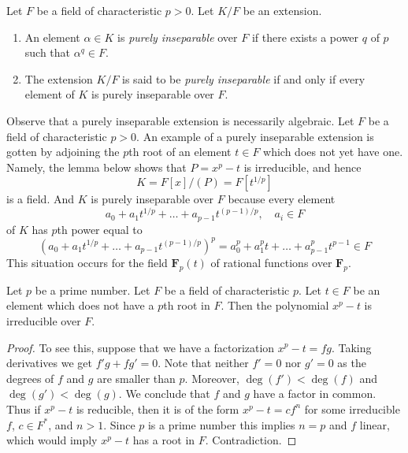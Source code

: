 \begin{definition}
\label{definition-purely-inseparable}
Let $F$ be a field of characteristic $p > 0$. Let $K/F$ be an extension.
\begin{enumerate}
\item An element $\alpha \in K$ is {\it purely inseparable} over $F$
if there exists a power $q$ of $p$ such that $\alpha^q \in F$.
\item The extension $K/F$ is said to be {\it purely inseparable}
if and only if every element of $K$ is purely inseparable over $F$.
\end{enumerate}
\end{definition}

\noindent
Observe that a purely inseparable extension is necessarily algebraic.
Let $F$ be a field of characteristic $p > 0$.
An example of a purely inseparable extension is gotten by adjoining
the $p$th root of an element $t \in F$ which does not yet have one. Namely,
the lemma below shows that $P = x^p - t$ is irreducible, and hence
$$
K = F[x]/(P) = F[t^{1/p}]
$$
is a field. And $K$ is purely inseparable over $F$ because every element
$$
a_0 + a_1t^{1/p} + \ldots + a_{p - 1}t^{(p - 1)/p},\quad a_i \in F
$$
of $K$ has $p$th power equal to
$$
(a_0 + a_1t^{1/p} + \ldots + a_{p - 1}t^{(p - 1)/p})^p =
a_0^p + a_1^p t + \ldots + a_{p - 1}^pt^{p - 1} \in F
$$
This situation occurs for the field
$\mathbf{F}_p(t)$ of rational functions over $\mathbf{F}_p$.

\begin{lemma}
\label{lemma-take-pth-root}
Let $p$ be a prime number. Let $F$ be a field of characteristic $p$.
Let $t \in F$ be an element which does not have a $p$th root in $F$.
Then the polynomial $x^p - t$ is irreducible over $F$.
\end{lemma}

\begin{proof}
To see this, suppose that we have a factorization
$x^p - t = f g$. Taking derivatives we get $f' g + f g' = 0$.
Note that neither $f' = 0$ nor $g' = 0$ as the degrees of $f$ and $g$
are smaller than $p$. Moreover, $\deg(f') < \deg(f)$ and $\deg(g') < \deg(g)$.
We conclude that $f$ and $g$ have a factor in common. Thus if $x^p - t$
is reducible, then it is of the form $x^p - t = c f^n$ for some irreducible
$f$, $c \in F^*$, and $n > 1$. Since $p$ is a prime number this
implies $n = p$ and $f$ linear, which would imply $x^p - t$ has a root
in $F$. Contradiction.
\end{proof}

